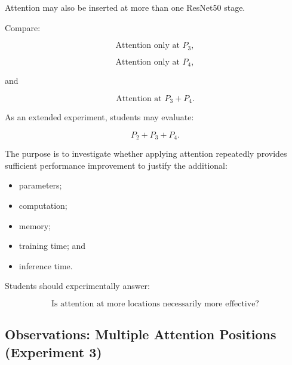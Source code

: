 \documentclass[10pt]{article}
\begin{document}
Attention may also be inserted at more than one ResNet50 stage.

Compare:

\[
\text{Attention only at }P_3,
\]

\[
\text{Attention only at }P_4,
\]

and

\[
\text{Attention at }P_3+P_4.
\]

As an extended experiment, students may evaluate:

\[
P_2+P_3+P_4.
\]

The purpose is to investigate whether applying attention repeatedly provides
sufficient performance improvement to justify the additional:

\begin{itemize}

\item parameters;

\item computation;

\item memory;

\item training time; and

\item inference time.

\end{itemize}

Students should experimentally answer:

\[
\boxed{
\text{Is attention at more locations necessarily more effective?}
}
\]


\subsection*{Observations: Multiple Attention Positions (Experiment 3)}
\begin{table}[H]
\centering
\caption{Experiment 3 -- single versus multiple attention positions (Channel$\to$Spatial).}
\scriptsize
{}
\end{table}
\end{document}
